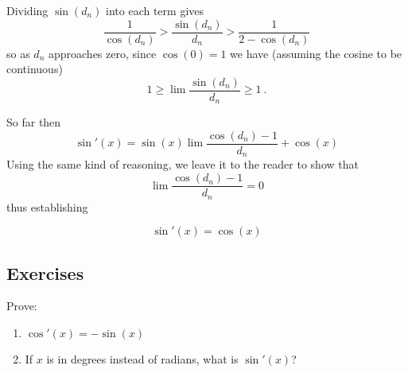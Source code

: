 Dividing $\sin(d_n)$ into each term gives
\[
\frac{1}{\cos(d_n)} > \frac{\sin(d_n)}{d_n} >   \frac{1}{2 - \cos(d_n)}
\]
so as $d_n$ approaches zero, since $\cos(0)=1$ we have (assuming the cosine to be continuous)
\[
1 \geq \lim \frac{\sin(d_n)}{d_n} \geq   1\ .
\]

So far then
\[
\sin'(x) =  \sin(x)\lim \frac{\cos(d_n) - 1}{d_n} + \cos(x)
\]
Using the same kind of reasoning, we leave it to the reader to show that
\[
\lim \frac{\cos(d_n) - 1}{d_n} = 0
\]
thus establishing
\begin{thm}\label{thm:DerivOfSin}
\[
\sin'(x) = \cos(x)
\]  
\end{thm}


\subsection{Exercises}
Prove:
\begin{enumerate}
\item $\cos'(x) = -\sin(x)$
\item If $x$ is in degrees instead of radians, what is $\sin'(x)$?

\end{enumerate}


%
%
%
%


